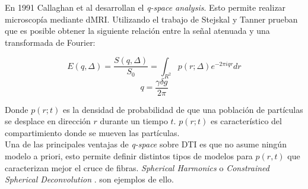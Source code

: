 En 1991 Callaghan et al \cite{Callaghan1991} desarrollan el 
\textit{q-space analysis}. Esto permite realizar microscop\'ia mediante
dMRI. Utilizando el trabajo de Stejskal y Tanner prueban que es posible
obtener la siguiente relaci\'on entre la se\~nal atenuada y una
transformada de Fourier:

$$E(q,\Delta) =  \frac{S(q,\Delta)}{S_0} = \int_{R^2}{p(r;\Delta)e^{-2\pi i q r} dr} $$
$$ q = \frac{\gamma \delta g}{2\pi} $$

Donde $p(r;t)$ es la densidad de probabilidad de que una poblaci\'on de 
part\'iculas se desplace en direcci\'on $r$ durante un tiempo $t$. $p(r;t)$
es caracter\'istico del compartimiento donde se mueven las part\'iculas. \\

Una de las principales ventajas de \textit{q-space} sobre DTI es que no
asume ning\'un modelo a priori, esto permite definir distintos tipos de
modelos para $p(r,t)$ que caracterizan mejor el cruce de fibras. 
\textit{Spherical Harmonics} \cite{Tuch2004} o 
\textit{Constrained Spherical Deconvolution} \cite{Tournier2004}.
son ejemplos de ello.
